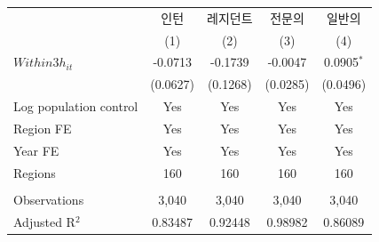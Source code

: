 \begingroup
\centering
\begin{tabular}{lcccc}
   \toprule
                          & 인턴     & 레지던트 & 전문의   & 일반의 \\   
                          & (1)      & (2)      & (3)      & (4)\\  
   \midrule 
   $Within3h_{it}$        & -0.0713  & -0.1739  & -0.0047  & 0.0905$^{*}$\\   
                          & (0.0627) & (0.1268) & (0.0285) & (0.0496)\\   
   Log population control & Yes      & Yes      & Yes      & Yes\\  
   Region FE              & Yes      & Yes      & Yes      & Yes\\  
   Year FE                & Yes      & Yes      & Yes      & Yes\\  
   Regions                & 160      & 160      & 160      & 160\\  
    \\
   Observations           & 3,040    & 3,040    & 3,040    & 3,040\\  
   Adjusted R$^2$         & 0.83487  & 0.92448  & 0.98982  & 0.86089\\  
   \bottomrule
\end{tabular}
\par\endgroup
